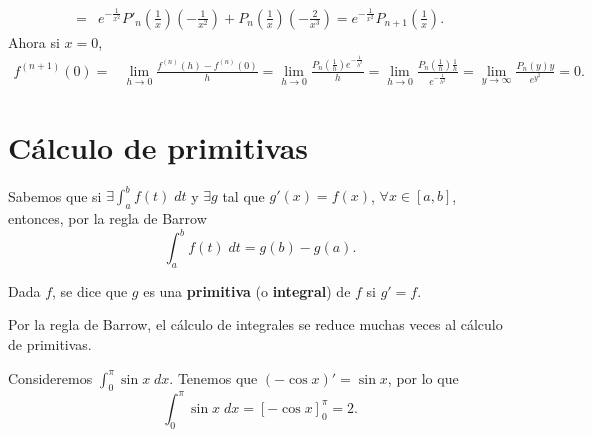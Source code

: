 \begin{eg}
\[\begin{split}
	= &  e^{-\frac{1}{x^{2}}}P'_{n}\left(\frac{1}{x}\right)\left(-\frac{1}{x^{2}}\right) + P_{n}\left(\frac{1}{x}\right)\left(-\frac{2}{x^{3}}\right) = e^{-\frac{1}{x^{2}}}P_{n+1}\left(\frac{1}{x}\right).
\end{split}
\]
Ahora si $\displaystyle x = 0 $, 
\[
\begin{split}
	f^{\left(n+1\right)}\left(0\right) = & \lim_{h \to 0}\frac{f^{\left(n\right)}\left(h\right)-f^{\left(n\right)}\left(0\right)}{h} = \lim_{h \to 0}\frac{P_{n}\left(\frac{1}{h}\right)e^{-\frac{1}{h^{2}}}}{h}  = \lim_{h \to 0}\frac{P_{n}\left(\frac{1}{h}\right)\frac{1}{h}}{e^{-\frac{1}{h^{2}}}}= \lim_{y \to \infty}\frac{P_{n}\left(y\right)y}{e^{y^{2}}} = 0.
\end{split}
\]
\end{eg}
\section{Cálculo de primitivas}
Sabemos que si $\displaystyle \exists \int^{b}_{a} f\left(t\right) \; dt $ y $\displaystyle \exists g $ tal que $\displaystyle g'\left(x\right) = f\left(x\right) $, $\displaystyle \forall x \in \left[a,b\right]  $, entonces, por la regla de Barrow
\[\int^{b}_{a} f\left(t\right) \; dt = g\left(b\right)-g\left(a\right) .\]
\begin{fdefinition}[Primitiva]
\normalfont Dada $\displaystyle f $, se dice que $\displaystyle g $ es una \textbf{primitiva} (o \textbf{integral}) de $\displaystyle f $ si $\displaystyle g' = f $.
\end{fdefinition}
\begin{observation}
\normalfont Por la regla de Barrow, el cálculo de integrales se reduce muchas veces al cálculo de primitivas.
\end{observation}
\begin{eg}
\normalfont Consideremos $\displaystyle \int^{\pi}_{0} \sin x \; dx $. Tenemos que $\displaystyle \left(-\cos x\right)' = \sin x $, por lo que 
\[ \int^{\pi }_{0} \sin x  \; dx = \left[-\cos x\right] ^{\pi }_{0} = 2 .\]
\end{eg}

